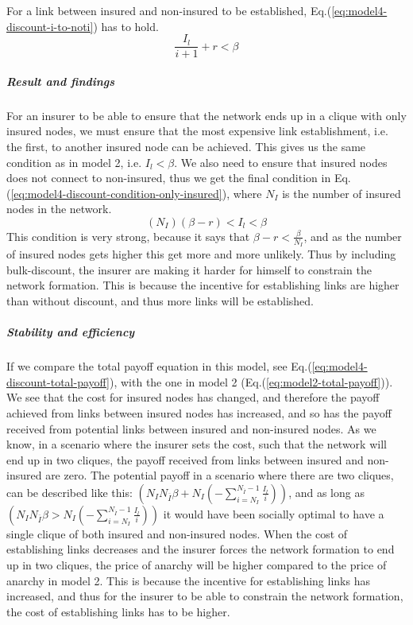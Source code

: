 For a link between insured and non-insured to be established, Eq.(\ref{eq:model4-discount-i-to-noti}) has to hold.
\begin{equation}
\frac{I_{l}}{i+1}+r<\beta
\label{eq:model4-discount-i-to-noti}
\end{equation}
\subparagraph{Result and findings}
For an insurer to be able to ensure that the network ends up in a clique with only insured nodes, we must ensure that the most expensive link establishment, i.e. the first, to another insured node can be achieved. This gives us the same condition as in model 2, i.e. $I_{l}<\beta$. 
We also need to ensure that insured nodes does not connect to non-insured, thus we get the final condition in Eq. (\ref{eq:model4-discount-condition-only-insured}), where $N_{I}$ is the number of insured nodes in the network.
\begin{equation}
(N_{I})(\beta-r)<I_{l}<\beta
\label{eq:model4-discount-condition-only-insured}
\end{equation}
This condition is very strong, because it says that $\beta-r<\frac{\beta}{N_{I}}$, and as the number of insured nodes gets higher this get more and more unlikely. 
Thus by including bulk-discount, the insurer are making it harder for himself to constrain the network formation. This is because the incentive for establishing links are higher than without discount, and thus more links will be established.
\subparagraph{Stability and efficiency}
If we compare the total payoff equation in this model, see Eq.(\ref{eq:model4-discount-total-payoff}), with the one in model 2 (Eq.(\ref{eq:model2-total-payoff})). We see that the cost for insured nodes has changed, and therefore the payoff achieved from links between insured nodes has increased, and so has the  payoff received from potential links between insured and non-insured nodes. 
As we know, in a scenario where the insurer sets the cost, such that the network will end up in two cliques, the payoff received from links between insured and non-insured are zero. The potential payoff in a scenario where there are two cliques, can be described like this: $(N_{I}N_{\overline{I}}\beta+N_{I}(-\sum_{i=N_{I}}^{N_{\overline{I}}-1}\frac{I_{l}}{i}))$, and as long as $(N_{I}N_{\overline{I}}\beta>N_{I}(-\sum_{i=N_{I}}^{N_{\overline{I}}-1}\frac{I_{l}}{i}))$ it would have been socially optimal to have a single clique of both insured and non-insured nodes.
When the cost of establishing links decreases and the insurer forces the network formation to end up in two cliques, the price of anarchy will be higher compared to the price of anarchy in model 2. 
This is because the incentive for establishing links has increased, and thus for the insurer to be able to constrain the network formation, the cost of establishing links has to be higher.

